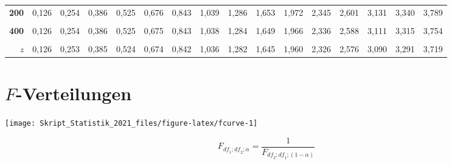 \documentclass[
  11pt,
  ngerman,
  a4paper,
]{report}
\begin{document}
\begin{table}[H]
{\begin{tabular}{>{}r|rrrrrrrrrrrrrrr}
\textbf{200} & 0,126 & 0,254 & 0,386 & 0,525 & 0,676 & 0,843 & 1,039 & 1,286 & 1,653 & 1,972 & 2,345 & 2,601 & 3,131 & 3,340 & 3,789\\
\addlinespace
\textbf{\cellcolor{gray!6}{300}} & \cellcolor{gray!6}{0,126} & \cellcolor{gray!6}{0,254} & \cellcolor{gray!6}{0,386} & \cellcolor{gray!6}{0,525} & \cellcolor{gray!6}{0,675} & \cellcolor{gray!6}{0,843} & \cellcolor{gray!6}{1,038} & \cellcolor{gray!6}{1,284} & \cellcolor{gray!6}{1,650} & \cellcolor{gray!6}{1,968} & \cellcolor{gray!6}{2,339} & \cellcolor{gray!6}{2,592} & \cellcolor{gray!6}{3,118} & \cellcolor{gray!6}{3,323} & \cellcolor{gray!6}{3,765}\\
\textbf{400} & 0,126 & 0,254 & 0,386 & 0,525 & 0,675 & 0,843 & 1,038 & 1,284 & 1,649 & 1,966 & 2,336 & 2,588 & 3,111 & 3,315 & 3,754\\
\textbf{\cellcolor{gray!6}{500}} & \cellcolor{gray!6}{0,126} & \cellcolor{gray!6}{0,253} & \cellcolor{gray!6}{0,386} & \cellcolor{gray!6}{0,525} & \cellcolor{gray!6}{0,675} & \cellcolor{gray!6}{0,842} & \cellcolor{gray!6}{1,038} & \cellcolor{gray!6}{1,283} & \cellcolor{gray!6}{1,648} & \cellcolor{gray!6}{1,965} & \cellcolor{gray!6}{2,334} & \cellcolor{gray!6}{2,586} & \cellcolor{gray!6}{3,107} & \cellcolor{gray!6}{3,310} & \cellcolor{gray!6}{3,747}\\
\textbf{$z$} & 0,126 & 0,253 & 0,385 & 0,524 & 0,674 & 0,842 & 1,036 & 1,282 & 1,645 & 1,960 & 2,326 & 2,576 & 3,090 & 3,291 & 3,719\\
\bottomrule
\end{tabular}}
\end{table}

\pagebreak

\hypertarget{tabelle-f}{%
\section*{\texorpdfstring{\(F\)-Verteilungen}{F-Verteilungen}}\label{tabelle-f}}

\begin{multicols}{2}
\vfill


\begin{center}\texttt{[image: Skript\_Statistik\_2021\_files/figure-latex/fcurve-1]} \end{center}

\vfill
\columnbreak
\vfill

$$
F_{\textit{df}_1;\textit{df}_2;\alpha}=\frac{1}{F_{\textit{df}_2;\textit{df}_1;(1-\alpha)}} 
$$

\vfill
\end{multicols}
\end{document}
